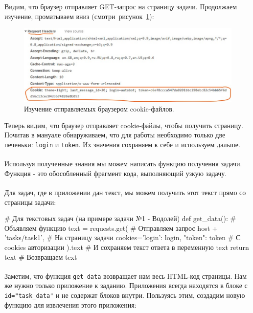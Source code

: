 \documentclass[12pt]{article}
\begin{document}
    Видим, что браузер отправляет GET-запрос на страницу задачи.
    Продолжаем изучение, проматываем вниз (смотри~рисунок~\ref{fig:browser2}):

    \begin{figure}[H]
        \includegraphics[width=\linewidth]{BrowserNetworkAnalysis2}
        \caption{Изучение отправляемых браузером cookie-файлов.}
        \label{fig:browser2}
    \end{figure}

    Теперь видим, что браузер отправляет cookie-файлы, чтобы получить страницу.
    Почитав в мануале обнаруживаем, что для работы необходимо только две печеньки: \verb|login| и \verb|token|.
    Их значения сохраняем к себе и используем дальше.
    \paragraph{}
    Используя полученные знания мы можем написать функцию получения задачи.
    Функция - это обособленный фрагмент кода, выполняющий узкую задачу.
    \paragraph{}
    Для задач, где в приложении дан текст, мы можем получить этот текст прямо со страницы задачи:

    \begin{pythoncode}
# Для текстовых задач (на примере задачи №1 - Водолей)
def get_data():                                   # Объявляем функцию
    text = requests.get(                          # Отправляем запрос
        host + 'tasks/task1',                     # На страницу задачи
        cookies={'login': login, "token": token}  # С cookies авторизации
    ).text                                        # И сохраняем текст ответа в переменную text
    return text                                   # Возвращаем text
    \end{pythoncode}

    \paragraph{}
    Заметим, что функция \verb|get_data| возвращает нам весь HTML-код страницы.
    Нам же нужно только приложение к заданию.
    Приложения всегда находятся в блоке с \verb|id="task_data"| и не содержат блоков внутри.
    Пользуясь этим, создадим новую функцию для извлечения этого приложения:
\end{document}
